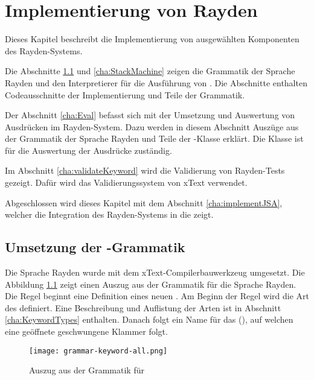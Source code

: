 \chapter{Implementierung von Rayden}
\label{cha:Implementierung}

Dieses Kapitel beschreibt die Implementierung von ausgewählten Komponenten des Rayden-Systems. 

\SuperPar
Die Abschnitte \ref{cha:KeywordGrammar} und \ref{cha:StackMachine} zeigen die Grammatik der Sprache Rayden und den Interpretierer für die Ausführung von . Die Abschnitte enthalten Codeausschnitte der Implementierung und Teile der Grammatik.

\SuperPar
Der Abschnitt \ref{cha:Eval} befasst sich mit der Umsetzung und Auswertung von Ausdrücken im Rayden-System. Dazu werden in diesem Abschnitt Auszüge aus der Grammatik der Sprache Rayden und Teile der -Klasse erklärt. Die Klasse  ist für die Auswertung der Ausdrücke zuständig. 

\SuperPar
Im Abschnitt \ref{cha:validateKeyword} wird die Validierung von Rayden-Tests gezeigt. Dafür wird das Validierungssystem von xText verwendet. 

\SuperPar
Abgeschlossen wird dieses Kapitel mit dem Abschnitt \ref{cha:implementJSA}, welcher die Integration des Rayden-Systems in die  zeigt. 


\section{Umsetzung der -Grammatik}
\label{cha:KeywordGrammar}

Die Sprache Rayden wurde mit dem xText-Compilerbauwerkzeug umgesetzt. Die Abbildung \ref{fig:keywordGrammar} zeigt einen Auszug aus der Grammatik für die Sprache Rayden. Die Regel  beginnt eine Definition eines neuen . Am Beginn der Regel wird die Art des  definiert. Eine Beschreibung und Auflistung der Arten ist in Abschnitt \ref{cha:KeywordTypes} enthalten. Danach folgt ein Name für das  (), auf welchen eine geöffnete geschwungene Klammer folgt.

\begin{figure}
\centering
\texttt{[image: grammar-keyword-all.png]}
\caption{Auszug aus der Grammatik für }
\label{fig:keywordGrammar}
\end{figure}

